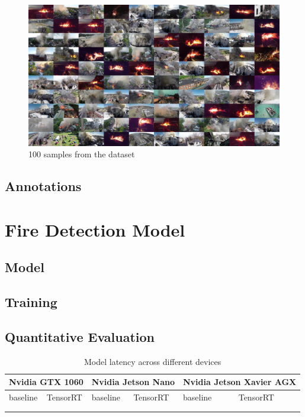   \begin{figure}
    \includegraphics[width=\linewidth]{figures/lowres_100tiles.jpg}
    \caption{100 samples from the dataset}
  \end{figure}

  \subsection{Annotations}

\section{Fire Detection Model}\label{sec:detection}

  \subsection{Model}\label{sec:model}

  \subsection{Training}\label{sec:training}
    
  \subsection{Quantitative Evaluation}\label{sec:eval}

  \begin{table}[]
    \begin{tabular}{|l|l|l|l|l|l|}
    \hline
    \multicolumn{2}{|l|}{Nvidia GTX 1060} & \multicolumn{2}{l|}{Nvidia Jetson Nano} & \multicolumn{2}{l|}{Nvidia Jetson Xavier AGX} \\ \hline
    baseline          & TensorRT          & baseline           & TensorRT           & baseline              & TensorRT              \\ \hline
                      &                   &                    &                    &                       &                       \\ \hline
                      &                   &                    &                    &                       &                       \\ \hline
    \end{tabular}
    \caption{Model latency across different devices}
    \end{table}

